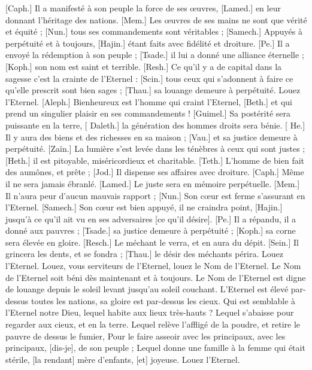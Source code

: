 \begin{multicols}{2}
[Caph.] Il a manifesté à son peuple la force de ses œuvres, [Lamed.] en leur donnant l'héritage des nations.
[Mem.] Les œuvres de ses mains ne sont que vérité et équité ; [Nun.] tous ses commandements sont véritables ;
[Samech.] Appuyés à perpétuité et à toujours, [Hajin.] étant faits avec fidélité et droiture.
[Pe.] Il a envoyé la rédemption à son peuple ; [Tsade.] il lui a donné une alliance éternelle ; [Koph.] son nom est saint et terrible.
[Resh.] Ce qu'il y a de capital dans la sagesse c'est la crainte de l'Eternel : [Scin.] tous ceux qui s'adonnent à faire ce qu'elle prescrit sont bien sages ; [Thau.] sa louange demeure à perpétuité.
\VerseOne{}Louez l'Eternel. [Aleph.] Bienheureux est l'homme qui craint l'Eternel, [Beth.] et qui prend un singulier plaisir en ses commandements !
[Guimel.] Sa postérité sera puissante en la terre, [ Daleth.] la génération des hommes droits sera bénie.
[ He.] Il y aura des biens et des richesses en sa maison ; [Vau.] et sa justice demeure à perpétuité.
[Zaïn.] La lumière s'est levée dans les ténèbres à ceux qui sont justes ; [Heth.] il est pitoyable, miséricordieux et charitable.
[Teth.] L'homme de bien fait des aumônes, et prête ; [Jod.] Il dispense ses affaires avec droiture.
[Caph.] Même il ne sera jamais ébranlé. [Lamed.] Le juste sera en mémoire perpétuelle.
[Mem.] Il n'aura peur d'aucun mauvais rapport ; [Nun.] Son cœur est ferme s'assurant en l'Eternel.
[Samech.] Son cœur est bien appuyé, il ne craindra point, [Hajin.] jusqu’à ce qu'il ait vu en ses adversaires [ce qu'il désire].
[Pe.] Il a répandu, il a donné aux pauvres ; [Tsade.] sa justice demeure à perpétuité ; [Koph.] sa corne sera élevée en gloire.
[Resch.] Le méchant le verra, et en aura du dépit. [Sein.] Il grincera les dents, et se fondra ; [Thau.] le désir des méchants périra.
\VerseOne{}Louez l'Eternel. Louez, vous serviteurs de l'Eternel, louez le Nom de l’Eternel.
Le Nom de l’Eternel soit béni dès maintenant et à toujours.
Le Nom de l’Eternel est digne de louange depuis le soleil levant jusqu’au soleil couchant.
L'Eternel est élevé par-dessus toutes les nations, sa gloire est par-dessus les cieux.
Qui est semblable à l'Eternel notre Dieu, lequel habite aux lieux très-hauts ?
Lequel s'abaisse pour regarder aux cieux, et en la terre.
Lequel relève l'affligé de la poudre, et retire le pauvre de dessus le fumier,
Pour le faire asseoir avec les principaux, avec les principaux, [dis-je], de son peuple ;
Lequel donne une famille à la femme qui était stérile, [la rendant] mère d'enfants, [et] joyeuse. Louez l'Eternel.

\end{multicols}
